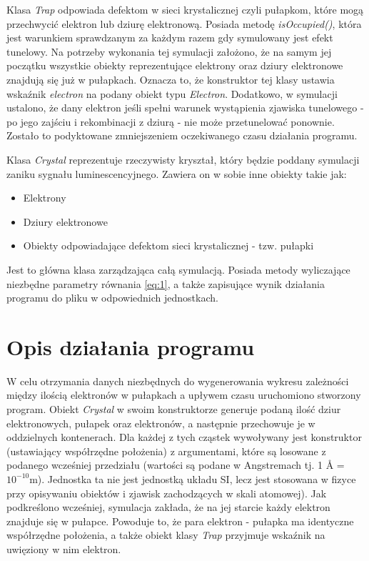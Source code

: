 Klasa \textit{Trap} odpowiada defektom w sieci krystalicznej czyli pułapkom, które mogą przechwycić elektron lub dziurę elektronową. Posiada metodę \textit{isOccupied()}, która jest warunkiem sprawdzanym za każdym razem gdy symulowany jest efekt tunelowy. Na potrzeby wykonania tej symulacji założono, że na samym jej początku wszystkie obiekty reprezentujące elektrony oraz dziury elektronowe znajdują się już w pułapkach. Oznacza to, że konstruktor tej klasy ustawia wskaźnik \textit{electron} na podany obiekt typu \textit{Electron}. Dodatkowo, w symulacji ustalono, że dany elektron jeśli spełni warunek wystąpienia zjawiska tunelowego - po jego zajściu i rekombinacji z dziurą - nie może przetunelować ponownie. Zostało to podyktowane zmniejszeniem oczekiwanego czasu działania programu.

Klasa \textit{Crystal} reprezentuje rzeczywisty kryształ, który będzie poddany symulacji zaniku sygnału luminescencyjnego. Zawiera on w sobie inne obiekty takie jak:

\begin{itemize}
\item Elektrony
\item Dziury elektronowe
\item Obiekty odpowiadające defektom sieci krystalicznej - tzw. pułapki
\end{itemize}

Jest to główna klasa zarządzająca całą symulacją. Posiada metody wyliczające niezbędne parametry równania \ref{eq:1}, a także zapisujące wynik działania programu do pliku w odpowiednich jednostkach.





\section{Opis działania programu}



W celu otrzymania danych niezbędnych do wygenerowania wykresu zależności między ilością elektronów w pułapkach a upływem czasu uruchomiono stworzony program. Obiekt \textit{Crystal} w swoim konstruktorze generuje podaną ilość dziur elektronowych, pułapek oraz elektronów, a następnie przechowuje je w oddzielnych kontenerach. Dla każdej z tych cząstek wywoływany jest konstruktor (ustawiający współrzędne położenia) z argumentami, które są losowane z podanego wcześniej przedziału (wartości są podane w Angstremach tj. 1 Å = $10^{-10}$m). Jednostka ta nie jest jednostką układu SI, lecz jest stosowana w fizyce przy opisywaniu obiektów i zjawisk zachodzących w skali atomowej). Jak podkreślono wcześniej, symulacja zakłada, że na jej starcie każdy elektron znajduje się w pułapce. Powoduje to, że para elektron - pułapka ma identyczne współrzędne położenia, a także obiekt klasy \textit{Trap} przyjmuje wskaźnik na uwięziony w nim elektron.

